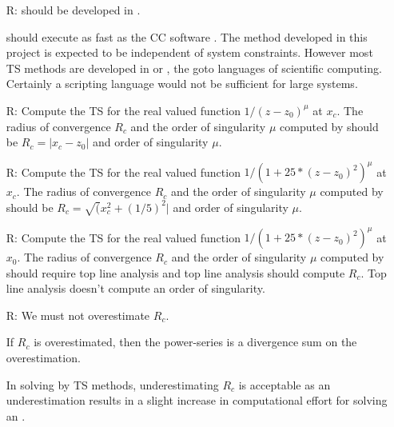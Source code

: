 \documentclass[12pt]{article}
\newcounter{reqnum} %
\newcommand{\rthereqnum}{R\thereqnum}
\newcommand{\rlabel}[1]{\refstepcounter{reqnum} \rthereqnum \label{#1}:}
\begin{document}
\begin{itemize}
  \item[\rlabel{R_Calculate}]  should be developed in \cpp.

     should execute as fast as the CC software \rdcon. The method developed in this
    project is expected to be independent of system constraints. However
    most TS methods are developed in \cpp or \fortran, the goto languages
    of scientific computing. Certainly a scripting language would not be
    sufficient for large systems.
  
  \item[\rlabel{R_VerifyRealOutput}] Compute the TS for the real valued
    function $1/(z-z_0)^{\mu}$ at $x_c$. The radius of convergence $R_c$
    and the order of singularity $\mu$ computed by  should
    be $R_c = | x_c - z_0 |$ and order of singularity $\mu$.
  
 \item[\rlabel{R_VerifyComplexOutput}] Compute the TS for the real valued function
   $1/(1 + 25*(z-z_0)^2)^{\mu}$ at $x_c$. The radius of convergence $R_c$
    and the order of singularity $\mu$ computed by  should
    be $R_c = \sqrt( x_c^2 + (1/5)^2 |$ and order of singularity $\mu$.
  
 \item[\rlabel{R_VerifyOutput}] Compute the TS for the real valued function
   $1/(1 + 25*(z-z_0)^2)^{\mu}$ at $x_0$. The radius of convergence $R_c$
    and the order of singularity $\mu$ computed by  should
    require top line analysis and top line analysis should compute
    $R_c$. Top line analysis doesn't compute an order of singularity.

  \item[\rlabel{R_Output}] We must not overestimate $R_c$.
    
    If $R_c$ is overestimated, then the power-series is a divergence sum on the overestimation.
  
    In \ode solving by TS methods, underestimating $R_c$ is acceptable as an underestimation
    results in a slight increase in computational effort for solving an \ode \ivp.
\end{itemize}
\end{document}
